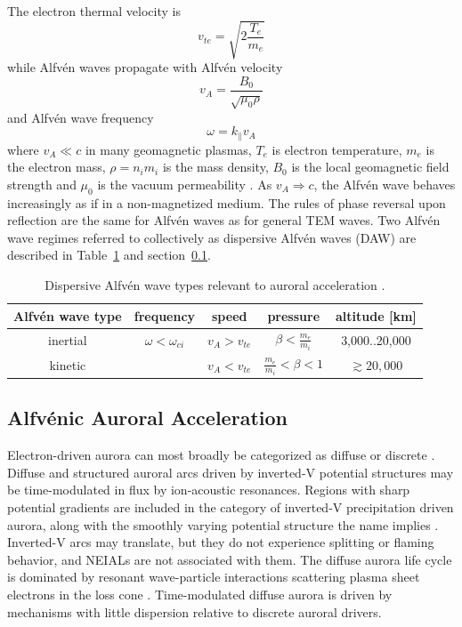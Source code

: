 The electron thermal velocity is
\begin{equation}
v_{te} = \sqrt{2\frac{T_e}{m_e}}
\end{equation}
while Alfvén waves propagate with Alfvén velocity
\begin{equation}
v_A = \frac{B_0}{\sqrt{\mu_0\rho}}
\end{equation}
and Alfvén wave frequency
\begin{equation}
\omega = k_\parallel v_A
\end{equation}
where $v_A \ll c$ in many geomagnetic plasmas, $T_e$ is electron temperature, $m_e$ is the electron mass, $\rho=n_im_i$ is the mass density, $B_0$ is the local geomagnetic field strength and $\mu_0$ is the vacuum permeability \citep{stasiewicz2000}.
As $v_A \Rightarrow c$, the Alfvén wave behaves increasingly as if in a non-magnetized medium.
The rules of phase reversal upon reflection are the same for Alfvén waves as for general TEM waves.
Two Alfvén wave regimes referred to collectively as dispersive Alfvén waves (DAW) are described in Table~\ref{tab:alfven} and section~\ref{sec:alfvenaccel}.
\begin{table}\centering
	\caption{Dispersive Alfvén wave types relevant to auroral acceleration \citep{stasiewicz2000}.}
    \label{tab:alfven}
	\begin{tabular}{ccccc}
        \toprule
		Alfvén wave type & frequency & speed & pressure & altitude [km] \\
		\midrule
		inertial & $\omega < \omega_{ci}$  & $v_A > v_{te} $  & $ \beta < \frac{m_e}{m_i} $ & 3,000..20,000 \\ %
		kinetic & & $v_A < v_{te}$ & $\frac{m_e}{m_i} < \beta < 1$ & $\gtrsim 20,000$ \\
        \bottomrule
	\end{tabular}
\end{table}


\FloatBarrier
\subsection{Alfvénic Auroral Acceleration}\label{sec:alfvenaccel}
Electron-driven aurora can most broadly be categorized as diffuse or discrete \citep{newell2009}.
Diffuse and structured auroral arcs driven by inverted-V potential structures may be time-modulated in flux by ion-acoustic resonances.
Regions with sharp potential gradients are included in the category of inverted-V precipitation driven aurora, along with the smoothly varying potential structure the name implies \citep{newell2009}.
Inverted-V arcs may translate, but they do not experience splitting or flaming behavior, and NEIALs are not associated with them.
The diffuse aurora life cycle is dominated by resonant wave-particle interactions scattering plasma sheet electrons in the loss cone \citep{Ni2016}.
Time-modulated diffuse aurora is driven by mechanisms with little dispersion relative to discrete auroral drivers.


